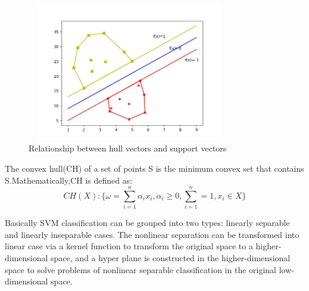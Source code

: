 \documentclass[a4paper]{article}
\begin{document}



\begin{figure}[h]
  \centering
  \includegraphics[width=9cm,height=6cm]{HullVector_SupportVector}
  \caption{Relationship between hull vectors and support vectors}
\end{figure}

The convex hull(CH) of a set of points S is the minimum convex set that contains S.Mathematically,CH is defined as:
$$
CH(X) :\{ \omega = \sum_{i=1} ^{n} \alpha_i x_i, \alpha_i \geq 0, \sum_{i=1} ^{n} = 1, x_i \in X \}
$$

Basically SVM classification can be grouped into two types: linearly separable and linearly inseparable cases. The nonlinear separation can be transformed into linear case via a kernel function to transform the original space to a higher-dimensional space, and a hyper plane is constructed in the higher-dimensional space to solve problems of nonlinear separable classification in the original low-dimensional space.
\end{document}
